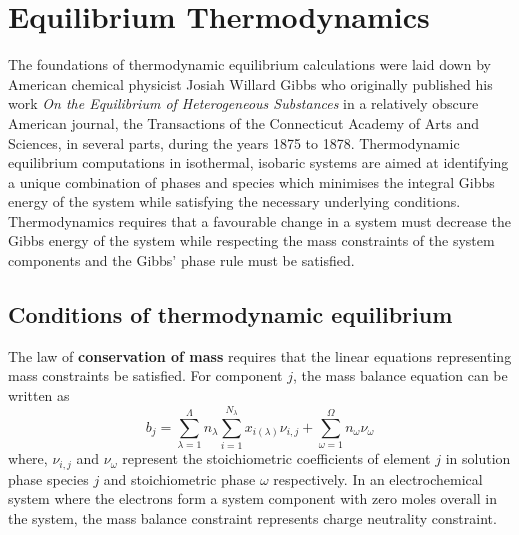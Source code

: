 \chapter{Equilibrium Thermodynamics} \label{chap:equilibrium}

	The foundations of thermodynamic equilibrium calculations were laid down by American chemical physicist Josiah Willard Gibbs who originally published his work \emph{On the Equilibrium of Heterogeneous Substances} in a relatively obscure American journal, the Transactions of the Connecticut Academy of Arts and Sciences, in several parts, during the years 1875 to 1878. Thermodynamic equilibrium computations in isothermal, isobaric systems are aimed at identifying a unique combination of phases and species which minimises the integral Gibbs energy of the system while satisfying the necessary underlying conditions. Thermodynamics requires that a favourable change in a system must decrease the Gibbs energy of the system while respecting the mass constraints of the system components and the Gibbs' phase rule must be satisfied.

  \section{Conditions of thermodynamic equilibrium}\label{sec:eqb_theory}
		The law of \textbf{conservation of mass} requires that the linear equations representing mass constraints be satisfied. For component $j$, the mass balance equation can be written as
			\begin{equation}\label{eq:massbalance}
				b_j = \sum_{\lambda=1}^{\Lambda} n_{\lambda}\sum_{i=1}^{N_{\lambda}}x_{i({\lambda})}{\nu}_{i,j} +  \sum_{\omega=1}^{\Omega} n_{\omega}{\nu}_{\omega}
			\end{equation}
			where, ${\nu}_{i,j}$ and ${\nu}_{\omega}$ represent the stoichiometric coefficients of element $j$ in solution phase species $j$ and stoichiometric phase $\omega$ respectively. In an electrochemical system where the electrons form a system component with zero moles overall in the system, the mass balance constraint represents charge neutrality constraint.

